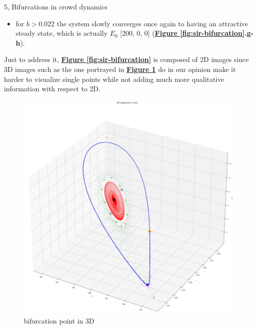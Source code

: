 \documentclass[10pt,a4paper]{article}
\begin{document}
\begin{task}{5, Bifurcations in crowd dynamics}
\begin{itemize}
    \item for \textbf{$b > 0.022$} the system slowly converges once again to having an attractive steady state, which is actually $E_0$ [200, 0, 0] (\textbf{\hyperref[fig:sir-bifurcation]{Figure \ref{fig:sir-bifurcation}}.g-h}).
\end{itemize}
Just to address it, \textbf{\hyperref[fig:sir-bifurcation]{Figure \ref{fig:sir-bifurcation}}} is composed of 2D images since 3D images such as the one portrayed in \textbf{\hyperref[fig:sir-bifurcation-3d]{Figure \ref{fig:sir-bifurcation-3d}}} do in our opinion make it harder to visualize single points while not adding much more qualitative information with respect to 2D.
\begin{figure}[h]
    \centering
    \includegraphics[scale=0.32]{images/5.3.big.png}
    \caption{bifurcation point in 3D}
    \label{fig:sir-bifurcation-3d}
\end{figure}


\end{task}
\end{document}

